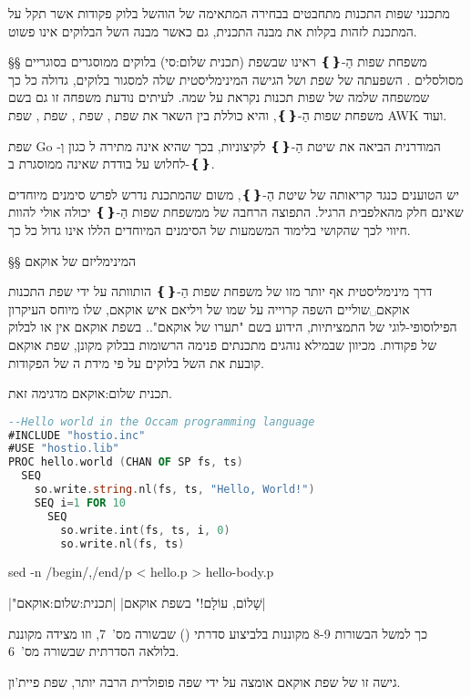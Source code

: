 מתכנני שפות התכנות מתחבטים בבחירה המתאימה של ה וה של בלוק פקודות אשר
תקל על המתכנת לזהות בקלות את מבנה התכנית, גם כאשר מבנה ה של הבלוקים אינו
פשוט.

§§ משפחת שפות הַ-{❴❵}
ראינו שבשפת  ( תכנית שלום:סי) בלוקים ממוסגרים בסוגריים מסולסלים
.
השפעתה של שפת  ושל הגישה המינימליסטית שלה למסגור בלוקים, גדולה
כל כך שמשפחה שלמה של שפות תכנות נקראת על שמה. לעיתים נודעת משפחה זו גם בשם
משפחת שפות הַ-{❴❵}, והיא כוללת בין השאר את שפת , שפת , שפת
, שפת AWK ועוד.

שפת Go המודרנית הביאה את שיטת הַ-{❴❵} לקיצוניות, בכך שהיא אינה מתירה ל
כגון  וְ- לחלוש על  בודדת שאינה ממוסגרת
ב-{❴❵}.

יש הטוענים כנגד קריאותה של שיטת הַ-{❴❵}, משום שהמתכנת נדרש לפרש סימנים מיוחדים
שאינם חלק מהאלפבית הרגיל. התפוצה הרחבה של ממשפחת שפות הַ-{❴❵} יכולה אולי
להוות חיווי לכך שהקושי בלימוד המשמעות של הסימנים המיוחדים הללו אינו גדול כל
כך.

§§ המינימליזם של אוקאם

דרך מינימליסטית אף יותר מזו של משפחת שפות הַ-{❴❵}
הותוותה על ידי שפת התכנות אוקאם␣שוליים{
  השפה קרוייה על שמו של ויליאם איש אוקאם, שלו מיוחס העיקרון הפילוסופי-לוגי של
התמציתיות, הידוע בשם "תערו של אוקאם".}.
בשפת אוקאם אין  או  לבלוק של פקודות.
מכיוון שבמילא נוהגים מתכנתים 
פנימה  הרשומות בבלוק מקונן,
שפת אוקאם קובעת את ה של בלוקים על פי מידת ה של הפקודות.

 תכנית שלום:אוקאם מדגימה זאת.

\begin{תכנית}
\setLTR
\begin{lstlisting}[language=Ada,style=Numbered,keywords={PROC,SEQ,FOR}]
--Hello world in the Occam programming language
#INCLUDE "hostio.inc"
#USE "hostio.lib"
PROC hello.world (CHAN OF SP fs, ts)
  SEQ
    so.write.string.nl(fs, ts, "Hello, World!")
    SEQ i=1 FOR 10
      SEQ
        so.write.int(fs, ts, i, 0)
        so.write.nl(fs, ts)
\end{lstlisting}
\bash
sed -n /begin/,/end/p < hello.p > hello-body.p
\END

    |"שָׁלוֹם, עוֹלָם!" בשפת אוקאם|
    |תכנית:שלום:אוקאם|
    \end{תכנית}

    כך למשל ה בשורות 8-9 מקוננות ב לביצוע סדרתי () שבשורה
    מס'~7, וזו מצידה מקוננת בלולאה הסדרתית שבשורה מס'~6.

    גישה זו של שפת אוקאם אומצה על ידי שפה פופולרית הרבה יותר, שפת פיית'ון.

